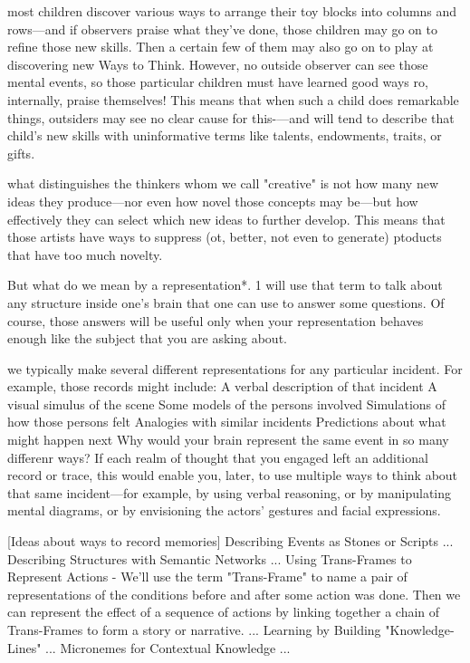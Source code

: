 \documentclass[10pt,a4paper]{article}
\begin{document}
most children discover various ways to arrange their toy blocks into columns and rows—and if observers praise what they've done, those children may go on to refine those new skills. Then a certain few of them may also go on to play at discovering new Ways to Think. However, no outside observer can see those mental events, so those particular children must have learned good ways ro, internally, praise themselves! This means that when such a child does remarkable things, outsiders may see no clear cause for this-—and will tend to describe that child's new skills with uninformative terms like talents, endowments, traits, or gifts. \cite[p.~276-277]{minsky}

what distinguishes the thinkers whom we call "creative" is not how many new ideas they produce—nor even how novel those concepts may be—but how effectively they can select which new ideas to further develop. This means that those artists have ways to suppress (ot, better, not even to generate) ptoducts that have too much novelty. \cite[p.~278]{minsky}

But what do we mean by a representation*. 1 will use that term to talk about any structure inside one's brain that one can use to answer some questions. Of course, those answers will be useful only when your representation behaves enough like the subject that you are asking about. \cite[p.~279]{minsky}

we typically make several different representations for any particular incident. For example, those records might include:
A verbal description of that incident
A visual simulus of the scene
Some models of the persons involved
Simulations of how those persons felt
Analogies with similar incidents
Predictions about what might happen next
Why would your brain represent the same event in so many differenr ways? If each realm of thought that you engaged left an additional record or trace, this would enable you, later, to use multiple ways to think about that same incident—for example, by using verbal reasoning, or by manipulating mental diagrams, or by envisioning the actors' gestures and facial expressions. \cite[p.~279-280]{minsky}

[Ideas about ways to record memories]
Describing Events as Stones or Scripts ...
Describing Structures with Semantic Networks ...
Using Trans-Frames to Represent Actions - We'll use the term "Trans-Frame" to name a pair of representations of the conditions before and after some action was done. Then we can represent the effect of a sequence of actions by linking together a chain of Trans-Frames to form a story or narrative. ...
Learning by Building "Knowledge-Lines" ...
Micronemes for Contextual Knowledge ...
\cite[p.~281-291]{minsky}
\end{document}
